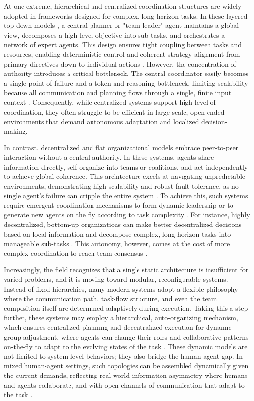\documentclass[11pt,a4paper]{article}
\begin{document}
At one extreme, hierarchical and centralized coordination structures are widely adopted in frameworks designed for complex, long-horizon tasks. In these layered top-down models \cite{arxiv:2403.08282v2}, a central planner or "team leader" agent maintains a global view, decomposes a high-level objective into sub-tasks, and orchestrates a network of expert agents. This design ensures tight coupling between tasks and resources, enabling deterministic control and coherent strategy alignment from primary directives down to individual actions \cite{arxiv:2308.12503v2}. However, the concentration of authority introduces a critical bottleneck. The central coordinator easily becomes a single point of failure and a token and reasoning bottleneck, limiting scalability because all communication and planning flows through a single, finite input context \cite{arxiv:2402.03578v1}. Consequently, while centralized systems support high-level of coordination, they often struggle to be efficient in large-scale, open-ended environments that demand autonomous adaptation and localized decision-making.

In contrast, decentralized and flat organizational models embrace peer-to-peer interaction without a central authority. In these systems, agents share information directly, self-organize into teams or coalitions, and act independently to achieve global coherence. This architecture excels at navigating unpredictable environments, demonstrating high scalability and robust fault tolerance, as no single agent's failure can cripple the entire system \cite{arxiv:2405.03825v1}. To achieve this, such systems require emergent coordination mechanisms to form dynamic leadership or to generate new agents on the fly according to task complexity \cite{arxiv:2406.07155v1}. For instance, highly decentralized, bottom-up organizations can make better decentralized decisions based on local information \cite{arxiv:2405.03825v1} and decompose complex, long-horizon tasks into manageable sub-tasks \cite{arxiv:2403.08282v2}. This autonomy, however, comes at the cost of more complex coordination to reach team consensus \cite{arxiv:2405.03825v1}.

Increasingly, the field recognizes that a single static architecture is insufficient for varied problems, and it is moving toward modular, reconfigurable systems. Instead of fixed hierarchies, many modern systems adopt a flexible philosophy where the communication path, task-flow structure, and even the team composition itself are determined adaptively during execution. Taking this a step further, these systems may employ a hierarchical, auto-organizing mechanism, which ensures centralized planning and decentralized execution for dynamic group adjustment, where agents can change their roles and collaborative patterns on-the-fly to adapt to the evolving states of the task \cite{arxiv:2403.08282v2}. These dynamic models are not limited to system-level behaviors; they also bridge the human-agent gap. In mixed human-agent settings, such topologies can be assembled dynamically given the current demands, reflecting real-world information asymmetry where humans and agents collaborate, and with open channels of communication that adapt to the task \cite{arxiv:2406.14928v1}.
\end{document}
